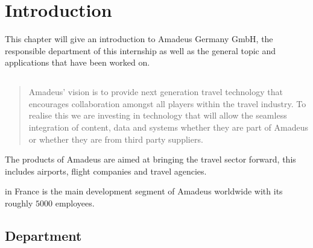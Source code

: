 \chapter{Introduction}

This  chapter  will  give  an  introduction  to  Amadeus  Germany  GmbH,  the  responsible
department  of  this  internship  as  well  as  the  general  topic  and  applications  that  have
been worked on.

\section{\amadeus}

\begin{quote}
Amadeus' vision is to provide next generation travel technology that encourages collaboration amongst all players within the travel industry. To realise this we are investing in technology that will allow the seamless integration of content, data and systems whether they are part of Amadeus or whether they are from third party suppliers.
\hfill\cite{amadeus2014}
\end{quote}

The products of Amadeus are aimed at bringing the travel sector forward, this includes airports, flight companies and travel agencies.

\amadeus in France is the main development segment of Amadeus worldwide with its roughly $5000$ employees.

\section{Department}
